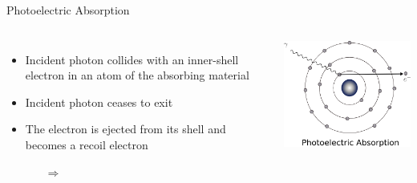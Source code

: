 \begin{frame}[c]{Photoelectric Absorption}
    \begin{columns}[c]
        \begin{itemize}
            \setlength\itemsep{0.2cm}
            \item Incident photon collides with an inner-shell electron in an atom of the absorbing material
            \item Incident photon ceases to exit
            \item The electron is ejected from its shell and becomes a recoil electron
                  \begin{itemize}
                      \item[$\Rightarrow$] 
                  \end{itemize}
        \end{itemize}
        \includegraphics[height=0.6\textheight]{images/pe}\\[-0.5\baselineskip]
    \end{columns}
\end{frame}

